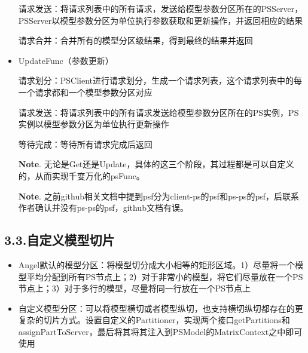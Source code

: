 \documentclass{article}
\begin{document}
\begin{itemize}
请求发送：将请求列表中的所有请求，发送给模型参数分区所在的PSServer，PSServer以模型参数分区为单位执行参数获取和更新操作，并返回相应的结果%

请求合并：合并所有的模型分区级结果，得到最终的结果并返回%

\item{}
UpdateFunc（参数更新）%

请求划分：PSClient进行请求划分，生成一个请求列表，这个请求列表中的每一个请求都和一个模型参数分区对应%

请求发送：将请求列表中的所有请求发送给模型参数分区所在的PS实例，PS实例以模型参数分区为单位执行更新操作%

等待完成：等待所有请求完成后返回%

\noindent{}\textbf{Note}.
无论是Get还是Update，具体的这三个阶段，其过程都是可以自定义的，从而实现千变万化的psFunc。%

\noindent{}\textbf{Note}.
之前github相关文档中提到psf分为client-ps的psf和ps-ps的psf，后联系作者确认并没有ps-ps的psf，github文档有误。%
\end{itemize}%

\subsection{3.3.\hspace*{0.5em}自定义模型切片}\label{section}%

\begin{itemize}[noitemsep,topsep=\mdcompacttopsep]%

\item{}Angel默认的模型分区：将模型切分成大小相等的矩形区域。1）尽量将一个模型平均分配到所有PS节点上；2）对于非常小的模型，将它们尽量放在一个PS节点上；3）对于多行的模型，尽量将同一行放在一个PS节点上%

\item{}自定义模型分区：可以将模型横切或者模型纵切，也支持横切纵切都存在的更复杂的切片方式。设置自定义的Partitioner，实现两个接口getPartitions和assignPartToServer，最后将其将其注入到PSModel的MatrixContext之中即可使用%
\end{itemize}%
\end{document}
